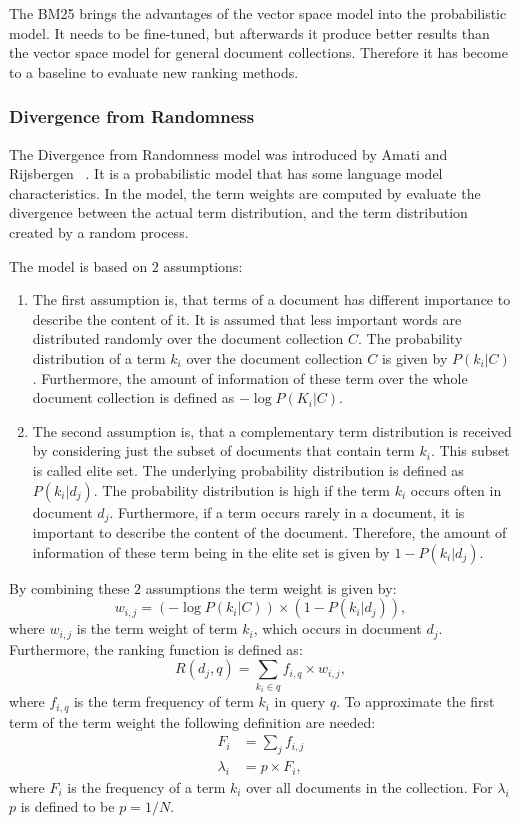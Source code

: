 The BM25 brings the advantages of the vector space model into the probabilistic model. It needs to be fine-tuned, but afterwards it produce better results than the vector space model for general document collections. Therefore it has become to a baseline to evaluate new ranking methods.

\subsubsection{Divergence from Randomness}
\label{sec:divergence_from_randomness}

The Divergence from Randomness model was introduced by Amati and Rijsbergen ~\cite{AmatiR02}. It is a probabilistic model that has some language model characteristics. In the model, the term weights are computed by evaluate the divergence between the actual term distribution, and the term distribution created by a random process.

The model is based on $2$ assumptions:
\begin{enumerate}
\item The first assumption is, that terms of a document has different importance to describe the content of it. It is assumed that less important words are distributed randomly over the document collection $C$. The probability distribution of a term $k_i$ over the document collection $C$ is given by $P(k_i|C)$. Furthermore, the amount of information of these term over the whole document collection is defined as $- \log P(K_i|C)$.
\item The second assumption is, that a complementary term distribution is received by considering just the subset of documents that contain term $k_i$. This subset is called elite set. The underlying probability distribution is defined as $P(k_i|d_j)$. The probability distribution is high if the term $k_i$ occurs often in document $d_j$. Furthermore, if a term occurs rarely in a document, it is important to describe the content of the document. Therefore, the amount of information of these term being in the elite set is given by $1 - P(k_i|d_j)$.
\end{enumerate}
By combining these $2$ assumptions the term weight is given by:
\begin{equation}
  \label{dfr_term_weight}
  w_{i, j} = (- \log P(k_i | C)) \times (1 - P(k_i | d_j)),
\end{equation}
where $w_{i, j}$ is the term weight of term $k_i$, which occurs in document $d_j$. Furthermore, the ranking function is defined as:
\begin{equation}
  R(d_j, q) = \sum_{k_i \in q} f_{i, q} \times w_{i, j},
\end{equation}
where $f_{i, q}$ is the term frequency of term $k_i$ in query $q$. To approximate the first term of the term weight the following definition are needed:
\begin{align}
  F_i & = \sum_j f_{i, j} \\
  \lambda_i & = p \times F_i,
\end{align}
where $F_i$ is the frequency of a term $k_i$ over all documents in the collection. For $\lambda_i$ $p$ is defined to be $p = 1/N$.

